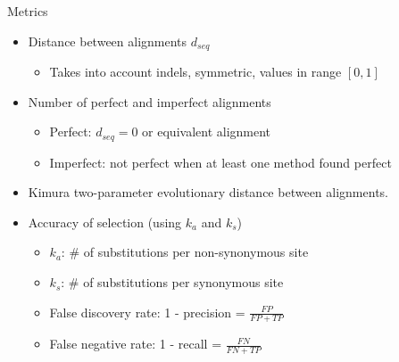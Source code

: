 \documentclass[aspectratio=169,font=14pt]{beamer}
\begin{document}
\begin{frame}{Metrics} %
\begin{itemize}
    \setlength\itemsep{1em}
    \item Distance between alignments $d_{seq}$
        \begin{itemize}
            \setlength\itemsep{1em}
            \item Takes into account indels, symmetric, values in range $[0,1]$
        \end{itemize}
    \item Number of perfect and imperfect alignments
        \begin{itemize}
            \setlength\itemsep{1em}
            \item Perfect: $d_{seq} = 0$ or equivalent alignment
            \item Imperfect: not perfect when at least one method found perfect
        \end{itemize}
    \item Kimura two-parameter evolutionary distance between alignments.
    \item Accuracy of selection (using $k_a$ and $k_s$)
        \begin{itemize}
            \setlength\itemsep{1em}
            \item $k_a$: \# of substitutions per non-synonymous site
            \item $k_s$: \# of substitutions per synonymous site
            \item False discovery rate: 1 - precision = $\frac{FP}{FP+TP}$
            \item False negative rate: 1 - recall = $\frac{FN}{FN+TP}$
        \end{itemize}
\end{itemize}
\end{frame} %
\end{document}
